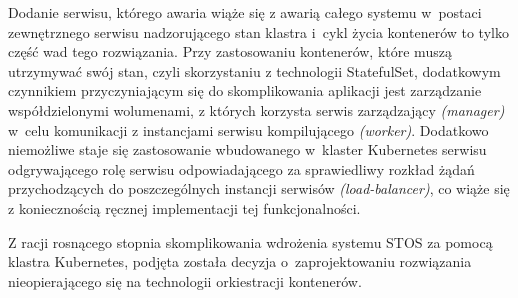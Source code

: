 Dodanie serwisu, którego awaria wiąże się z awarią całego systemu w~postaci zewnętrznego serwisu nadzorującego stan klastra i~cykl życia kontenerów to tylko część wad tego rozwiązania. Przy zastosowaniu kontenerów, które muszą utrzymywać swój stan, czyli skorzystaniu z technologii StatefulSet, dodatkowym czynnikiem przyczyniającym się do skomplikowania aplikacji jest zarządzanie współdzielonymi wolumenami, z których korzysta serwis zarządzający \textit{(manager)} w~celu komunikacji z instancjami serwisu kompilującego \textit{(worker)}. Dodatkowo niemożliwe staje się zastosowanie wbudowanego w~klaster Kubernetes serwisu odgrywającego rolę serwisu odpowiadającego za sprawiedliwy rozkład żądań przychodzących do poszczególnych instancji serwisów \textit{(load-balancer)}, co wiąże się z koniecznością ręcznej implementacji tej funkcjonalności.

Z racji rosnącego stopnia skomplikowania wdrożenia systemu STOS za pomocą klastra Kubernetes, podjęta została decyzja o~zaprojektowaniu rozwiązania nieopierającego się na technologii orkiestracji kontenerów.
